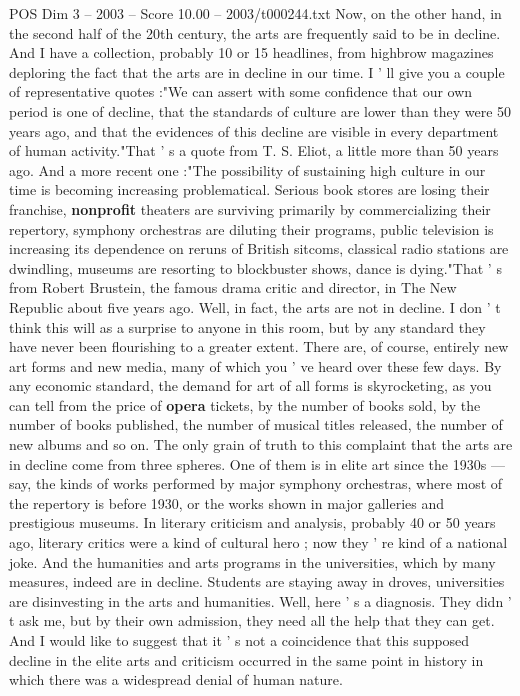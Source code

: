 \begin{textsample}{POS Dim 3 – 2003 – Score 10.00 – 2003/t000244.txt}
Now, on the other hand, in the second half of the 20th century, the arts are frequently said to be in decline.
And I have a collection, probably 10 or 15 headlines, from highbrow magazines deploring the fact that the arts are in decline in our time.
I ' ll give you a couple of representative quotes :"We can assert with some confidence that our own period is one of decline, that the standards of culture are lower than they were 50 years ago, and that the evidences of this decline are visible in every department of human activity."That ' s a quote from T.
S.
Eliot, a little more than 50 years ago.
And a more recent one :"The possibility of sustaining high culture in our time is becoming increasing problematical.
Serious book stores are losing their franchise, \textbf{nonprofit} theaters are surviving primarily by commercializing their repertory, symphony orchestras are diluting their programs, public television is increasing its dependence on reruns of British sitcoms, classical radio stations are dwindling, museums are resorting to blockbuster shows, dance is dying."That ' s from Robert Brustein, the famous drama critic and director, in The New Republic about five years ago.
Well, in fact, the arts are not in decline.
I don ' t think this will as a surprise to anyone in this room, but by any standard they have never been flourishing to a greater extent.
There are, of course, entirely new art forms and new media, many of which you ' ve heard over these few days.
By any economic standard, the demand for art of all forms is skyrocketing, as you can tell from the price of \textbf{opera} tickets, by the number of books sold, by the number of books published, the number of musical titles released, the number of new albums and so on.
The only grain of truth to this complaint that the arts are in decline come from three spheres.
One of them is in elite art since the 1930s — say, the kinds of works performed by major symphony orchestras, where most of the repertory is before 1930, or the works shown in major galleries and prestigious museums.
In literary criticism and analysis, probably 40 or 50 years ago, literary critics were a kind of cultural hero ; now they ' re kind of a national joke.
And the humanities and arts programs in the universities, which by many measures, indeed are in decline.
Students are staying away in droves, universities are disinvesting in the arts and humanities.
Well, here ' s a diagnosis.
They didn ' t ask me, but by their own admission, they need all the help that they can get.
And I would like to suggest that it ' s not a coincidence that this supposed decline in the elite arts and criticism occurred in the same point in history in which there was a widespread denial of human nature.

\end{textsample}
